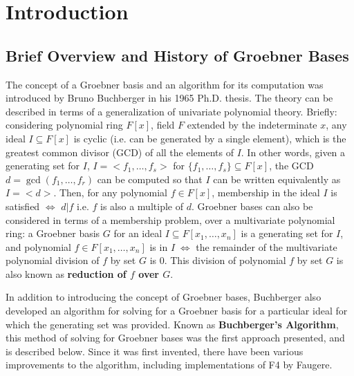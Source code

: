 \documentclass[letterpaper,12pt,titlepage,oneside,final]{book}
\begin{document}


\chapter{Introduction}

\section{Brief Overview and History of Groebner Bases}
 
The concept of a Groebner basis and an algorithm for its computation was introduced by Bruno Buchberger in his 1965 Ph.D. thesis.  The theory can be described in terms of a generalization of univariate polynomial theory.  Briefly: considering polynomial ring ${F[x]}$, field ${F}$ extended by the indeterminate ${x}$, any ideal ${I \subseteq F[x]}$ is cyclic (i.e. can be generated by a single element), which is the greatest common divisor (GCD) of all the elements of ${I}$.  In other words, given a generating set for ${I}$, ${I = <f_1, \ldots, f_s>}$ for ${\{f_1, \ldots, f_s\} \subseteq F[x]}$, the GCD ${d = \gcd(f_1, \ldots, f_r)}$ can be computed so that ${I}$ can be written equivalently as ${I = <d>}$.  Then, for any polynomial ${f \in F[x]}$, membership in the ideal ${I}$ is satisfied ${\iff}$ ${d | f}$ i.e. ${f}$ is also a multiple of ${d}$.  Groebner bases can also be considered in terms of a membership problem, over a multivariate polynomial ring: a Groebner basis ${G}$ for an ideal ${I \subseteq F[x_1, \ldots, x_n]}$ is a generating set for ${I}$, and polynomial ${f \in F[x_1, \ldots, x_n]}$ is in ${I \; \iff}$ the remainder of the multivariate polynomial division of ${f}$ by set ${G}$ is 0.  This division of polynomial ${f}$ by set ${G}$ is also known as \textbf{reduction of ${f}$ over ${G}$}. 

In addition to introducing the concept of Groebner bases, Buchberger also developed an algorithm for solving for a Groebner basis for a particular ideal for which the generating set was provided.  Known as \textbf{Buchberger's Algorithm}, this method of solving for Groebner bases was the first approach presented, and is described below.  Since it was first invented, there have been various improvements to the algorithm, including implementations of F4 by Faugere.    
\end{document}
